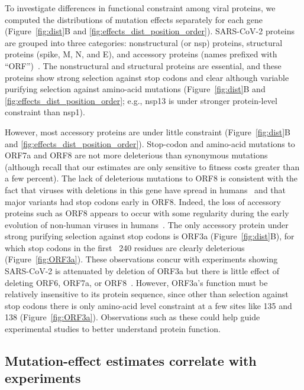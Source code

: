 \documentclass[9pt,twocolumn,twoside]{gsajnl_modified}
\begin{document}
To investigate differences in functional constraint among viral proteins, we computed the distributions of mutation effects separately for each gene (Figure~\ref{fig:dist}B and \ref{fig:effects_dist_position_order}).
SARS-CoV-2 proteins are grouped into three categories: nonstructural (or nsp) proteins, structural proteins (spike, M, N, and E), and accessory proteins (names prefixed with ``ORF'')~\citep{v2021coronavirus}.
The nonstructural and structural proteins are essential, and these proteins show strong selection against stop codons and clear although variable purifying selection against amino-acid mutations (Figure~\ref{fig:dist}B and \ref{fig:effects_dist_position_order}; e.g., nsp13 is under stronger protein-level constraint than nsp1).

However, most accessory proteins are under little constraint (Figure~\ref{fig:dist}B and \ref{fig:effects_dist_position_order}).
Stop-codon and amino-acid mutations to ORF7a and ORF8 are not more deleterious than synonymous mutations (although recall that our estimates are only sensitive to fitness costs greater than a few percent).
The lack of deleterious mutations to ORF8 is consistent with the fact that viruses with deletions in this gene have spread in humans~\citep{su2020discovery} and that major variants had stop codons early in ORF8.
Indeed, the loss of accessory proteins such as ORF8 appears to occur with some regularity during the early evolution of non-human viruses in humans~\citep{rochman2022molecular}.
The only accessory protein under strong purifying selection against stop codons is ORF3a (Figure~\ref{fig:dist}B), for which stop codons in the first ~240 residues are clearly deleterious (Figure~\ref{fig:ORF3a}).
These observations concur with experiments showing SARS-CoV-2 is attenuated by deletion of ORF3a but there is little effect of deleting ORF6, ORF7a, or ORF8~\citep{mcgrath2022sars,silvas2021contribution,liu2022live}.
However, ORF3a's function must be relatively insensitive to its protein sequence, since other than selection against stop codons there is only amino-acid level constraint at a few sites like 135 and 138 (Figure~\ref{fig:ORF3a}).
Observations such as these could help guide experimental studies to better understand protein function.

\subsection*{Mutation-effect estimates correlate with experiments}
\end{document}
